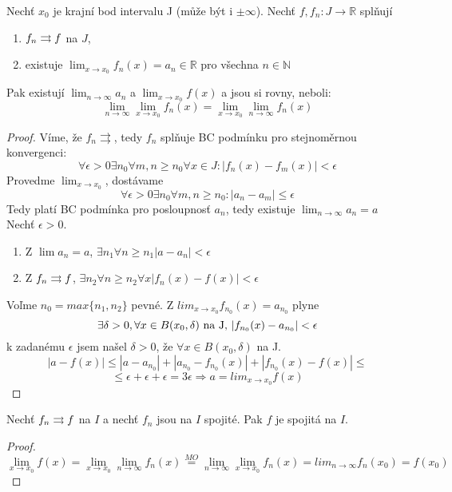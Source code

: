 \begin{vetat}
Nechť $x_0$ je krajní bod intervalu J (může být i $\pm \infty$). Nechť $f, f_n : J \rightarrow \mathbb{R}$ splňují
\begin{enumerate}
\item $f_n \rightrightarrows f$ na $J$,
\item existuje $\lim_{x \rightarrow x_0} f_n(x) = a_n \in \mathbb{R}$ pro všechna $n \in \mathbb{N}$
\end{enumerate}
Pak existují $\lim_{n \rightarrow \infty} a_n$ a $\lim_{x \rightarrow x_0} f(x)$ a jsou si rovny, neboli:
$$\lim_{n \rightarrow \infty} \lim_{x \rightarrow x_0} f_n(x) = \lim_{x \rightarrow x_0} \lim_{n \rightarrow \infty} f_n(x)$$
\end{vetat}
\begin{proof}
Víme, že $f_n \rightrightarrows$, tedy $f_n$ splňuje BC podmínku pro stejnoměrnou konvergenci:
$$\forall \epsilon > 0 \exists n_0 \forall m,n \geq n_0 \forall x \in J: |f_n(x) - f_m(x)| < \epsilon $$
Provedme $\lim_{x \to x_0}$, dostávame 
$$\forall \epsilon>0 \exists n_0 \forall m,n \geq n_0 : |a_n - a_m| \leq \epsilon$$
Tedy platí BC podmínka pro posloupnosť $a_n$, tedy existuje $\lim_{n \to \infty}a_n = a$
Nechť $\epsilon > 0$. 
\begin{enumerate}
\item Z $\lim a_n = a$, $ \exists n_1 \forall n \geq n_1 |a - a_n| < \epsilon $
\item Z $f_n \rightrightarrows f$, $ \exists n_2 \forall n \geq n_2 \forall x |f_n(x) - f(x)| < \epsilon$
\end{enumerate}
Voľme $n_0 = max \{n_1,n_2\}$ pevné. Z $lim_{x \to x_0}f_{n_0}(x) = a_{n_0}$ plyne 
$$\hbox{$\exists \delta > 0, \forall x \in B(x_0,\delta)$ na J, $|f_{n_0}(x) - a_{n_0}| < \epsilon$}$$
k zadanému $\epsilon$ jsem našel $\delta > 0$, že $\forall x \in B(x_0, \delta)$ na J.
$$|a - f(x)| \leq |a - a_{n_0}| + |a_{n_0} - f_{n_0}(x)| + |f_{n_0}(x) - f(x)| \leq $$ $$\leq \epsilon + \epsilon + \epsilon = 3\epsilon \Rightarrow a=lim_{x \to x_0}f(x)$$
\end{proof}

\begin{dusledek}
Nechť $f_n \rightrightarrows f$ na $I$ a nechť $f_n$ jsou na $I$ spojité. Pak $f$ je spojitá na $I$.
\end{dusledek}
\begin{proof}
$$\lim_{x \to x_0}f(x) = \lim_{x \to x_0} \lim_{n \to \infty}f_n(x) \overset{MO}{=} \lim_{n \to \infty}\lim_{x \to x_0}f_n(x)=lim_{n \to \infty}f_n(x_0) = f(x_0)$$
\end{proof}

